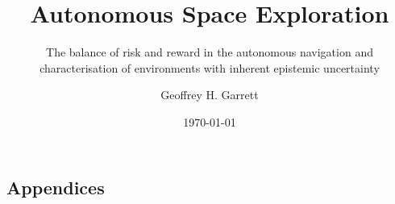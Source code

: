 \documentclass[
    11pt,
]{tudat}
\begin{document}

\title{Autonomous Space Exploration}
\author{Geoffrey H. Garrett}
\subtitle{The balance of risk and reward in the autonomous navigation and characterisation of environments with inherent epistemic uncertainty}
\subject{M.Sc. Literature Review}
\date{\today}

\makecover

\newpage


\thispagestyle{empty}
\mbox{}
\newpage

\frontmatter %

\setlength{\glsdescwidth}{0.9\textwidth}

\printnoidxglossary[type=\acronymtype, title={List of Abbreviations}]



\listoffigures

\listoftables\newpage

\setcounter{tocdepth}{2} %
\tableofcontents


\mainmatter %




% 
% 

% 
% 

\newpage

% 
\printbibliography
\backmatter

\begin{appendices}
    \chapter{Appendices}
    \renewcommand{\thesection}{\Alph{section}}
    \renewcommand\theequation{\Alph{section}.\arabic{equation}}
    
    
    
\end{appendices}
\end{document}
